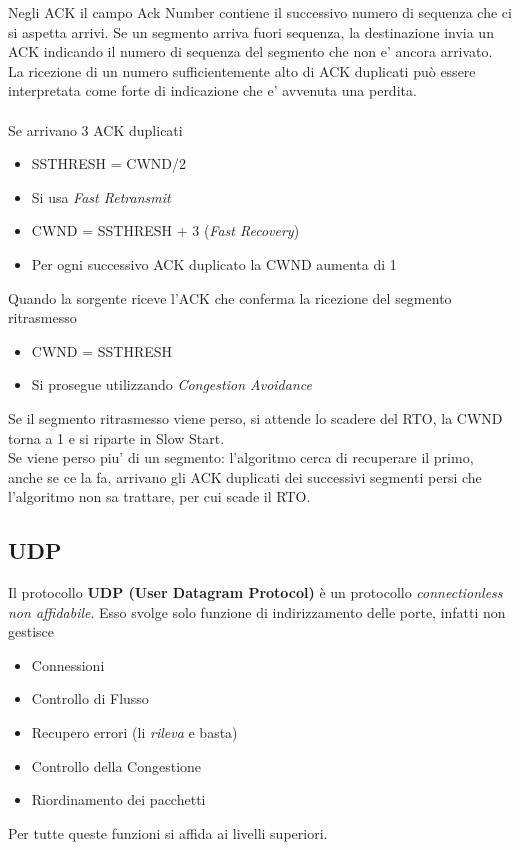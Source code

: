 \documentclass{article}
\newcounter{subsubsubsection}[subsubsection]
\begin{document}
                    Negli ACK il campo Ack Number contiene il successivo numero di sequenza che ci si aspetta arrivi. Se un segmento arriva fuori sequenza, la destinazione invia un ACK indicando il numero di sequenza del segmento che non e’ ancora arrivato.\\
                    La ricezione di un numero sufficientemente alto di ACK duplicati può essere interpretata come forte di indicazione che e’ avvenuta una perdita.\\
                    \\
                    Se arrivano 3 ACK duplicati
                    \begin{itemize}
                        \item SSTHRESH = CWND/2
                        \item Si usa \textit{Fast Retransmit}
                        \item CWND = SSTHRESH + 3 (\textit{Fast Recovery})
                        \item Per ogni successivo ACK duplicato la CWND aumenta di 1
                    \end{itemize} 
                    Quando la sorgente riceve l’ACK che conferma la ricezione del segmento ritrasmesso
                    \begin{itemize}
                        \item CWND = SSTHRESH
                        \item Si prosegue utilizzando \textit{Congestion Avoidance}
                    \end{itemize}
                    Se il segmento ritrasmesso viene perso, si attende lo scadere del RTO, la CWND torna a 1 e si riparte in Slow Start.\\
                    Se viene perso piu’ di un segmento: l’algoritmo cerca di recuperare il primo, anche se ce la fa, arrivano gli ACK duplicati dei successivi segmenti persi che l’algoritmo non sa trattare, per cui scade il RTO.
                
        \subsection{UDP}
            Il protocollo \textbf{UDP (User Datagram Protocol)} è un protocollo \textit{connectionless non affidabile}. Esso svolge solo funzione di indirizzamento delle porte, infatti non gestisce
            \begin{itemize}
                \item Connessioni
                \item Controllo di Flusso
                \item Recupero errori (li \textit{rileva} e basta)
                \item Controllo della Congestione
                \item Riordinamento dei pacchetti
            \end{itemize}         
            Per tutte queste funzioni si affida ai livelli superiori.
            
\end{document}
